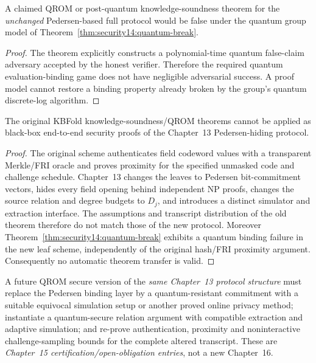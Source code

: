 \begin{corollary}\label{cor:security14:no-pq}
A claimed QROM or post-quantum
knowledge-soundness theorem
for the \emph{unchanged}
Pedersen-based full protocol
would be false under
the quantum group
model of
Theorem~\ref{thm:security14:quantum-break}.
\end{corollary}
\begin{proof}
The theorem explicitly
constructs a
polynomial-time quantum
false-claim adversary
accepted by the honest
verifier. Therefore the
required quantum
evaluation-binding game
does not have negligible
adversarial success.
A proof model cannot
restore a binding
property already
broken by the group's
quantum discrete-log
algorithm.
\end{proof}

\begin{proposition}\label{prop:security14:qrom-nontransfer}
The original KBFold
knowledge-soundness/QROM
theorems cannot be applied
as black-box end-to-end
security proofs of
the Chapter~13
Pedersen-hiding protocol.
\end{proposition}
\begin{proof}
The original scheme
authenticates field
codeword values with
a transparent Merkle/FRI
oracle and proves
proximity for the
specified unmasked code
and challenge schedule.
Chapter~13 changes
the leaves to Pedersen
bit-commitment vectors,
hides every field
opening behind
independent NP proofs,
changes the source
relation and degree
budgets to $D_j$,
and introduces
a distinct simulator
and extraction interface.
The assumptions and
transcript distribution
of the old theorem
therefore do not match
those of the new
protocol. Moreover
Theorem~\ref{thm:security14:quantum-break}
exhibits a quantum
binding failure in
the new leaf scheme,
independently of the
original hash/FRI
proximity argument.
Consequently no
automatic theorem
transfer is valid.
\end{proof}

\begin{definition}\label{def:security14:pq-replacement}
A future QROM secure
version of the \emph{same
Chapter~13 protocol
structure} must replace
the Pedersen binding layer
by a quantum-resistant
commitment with a
suitable equivocal
simulation setup or
another proved
online privacy method;
instantiate a
quantum-secure
relation argument
with compatible
extraction and adaptive
simulation;
and re-prove
authentication,
proximity and
noninteractive
challenge-sampling
bounds for the complete
altered transcript.
These are \emph{Chapter~15
certification/open-obligation
entries}, not a new
Chapter~16.
\end{definition}

